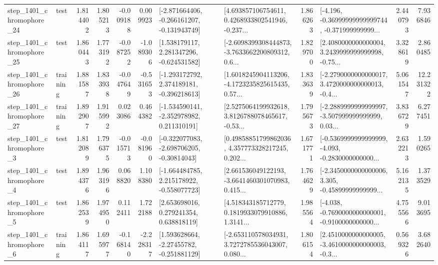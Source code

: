 \begin{tabular}{llrrrrllrlrr}
 step\_1401\_chromophore\_24 &      test &      1.814402 &    1.805213 &     -0.009188 &  0.009923 &  [-2.871664406, -0.266161207, -0.131943749] &  [4.693857106754611, 0.4268933802541946, -0.237... &       1.866263 &  [-4.196, -0.36999999999999744, -0.371999999999... &            2.440793 &          7.936846 \\
 step\_1401\_chromophore\_25 &      test &      1.860443 &    1.773192 &     -0.087252 & -1.089306 &    [1.538179117, 2.281347296, -0.624531582] &  [-2.6098399308444873, -3.7633662200809312, 0.6... &       1.829700 &  [2.4080000000000004, 3.2439999999999998, -0.75... &            3.328619 &          2.860485 \\
 step\_1401\_chromophore\_26 &  training &      1.881587 &    1.833938 &     -0.047649 & -0.531653 &   [-1.293172792, 2.374189181, -0.396218613] &  [1.6018245904113206, -4.1723235825615435, 0.57... &       1.833639 &  [-2.2790000000000017, 3.4720000000000013, -0.4... &            5.061547 &         12.231322 \\
 step\_1401\_chromophore\_27 &  training &      1.892907 &    1.915992 &      0.023086 &  0.464382 &   [-1.534590141, -2.352978982, 0.211310191] &  [2.5275064199932618, 3.8126788078465617, -0.53... &       1.795673 &  [-2.2889999999999997, -3.507999999999999, 0.03... &            3.836729 &          6.277451 \\
  step\_1401\_chromophore\_3 &      test &      1.812089 &    1.796375 &     -0.015713 & -0.081960 &   [-0.322077083, -2.698706205, -0.30814043] &  [0.49858851799862036, 4.357773328217245, 0.202... &       1.671771 &  [-0.5369999999999999, -4.093, -0.2830000000000... &            2.632213 &          1.590265 \\
  step\_1401\_chromophore\_4 &      test &      1.894376 &    1.963196 &      0.068820 &  1.108380 &   [-1.664484785, 2.215178922, -0.558077723] &  [2.661536049122193, -3.6641460301070983, 0.415... &       1.764629 &  [-2.3450000000000006, 3.305, -0.45899999999999... &            5.162135 &          1.373529 \\
  step\_1401\_chromophore\_5 &      test &      1.862539 &    1.974950 &      0.112411 &  1.722188 &     [2.653698016, 0.279241354, 0.638818119] &  [4.518343185712779, 0.1819933079910886, 1.3141... &       1.985564 &  [-4.038, -0.7690000000000001, -0.9100000000000... &            4.755566 &          9.013695 \\
  step\_1401\_chromophore\_6 &  training &      1.864117 &    1.695977 &     -0.168140 & -2.228317 &    [1.593628664, -2.27455782, -0.251881129] &  [-2.653110578034931, 3.7272785536043007, 0.080... &       1.806154 &  [2.4510000000000005, -3.4610000000000003, -0.3... &            0.569326 &          3.682640 \\

\end{tabular}
